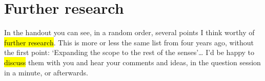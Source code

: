 \section{Further research}

\begin{paper}
	In the handout you can see, in a random order, several points I think worthy of \hl{further research}. This is more or less the same list from four years ago, without the first point: ‘Expanding the scope to the rest of the senses’… I’d be happy to \hl{discuss} them with you and hear your comments and ideas, in the question session in a minute, or afterwards.
\end{paper}



